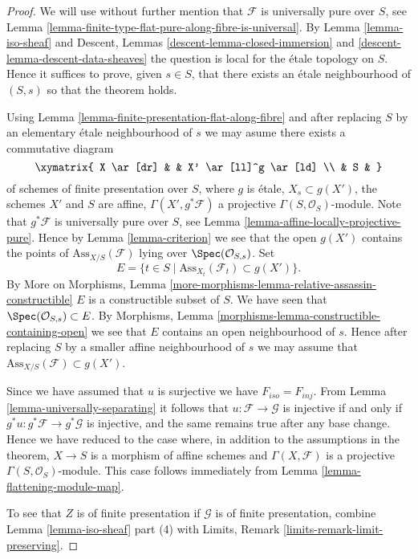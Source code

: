 \begin{proof}
We will use without further mention that $\mathcal{F}$ is universally pure
over $S$, see
Lemma \ref{lemma-finite-type-flat-pure-along-fibre-is-universal}.
By
Lemma \ref{lemma-iso-sheaf}
and
Descent, Lemmas \ref{descent-lemma-closed-immersion} and
\ref{descent-lemma-descent-data-sheaves}
the question is local for the \'etale topology on $S$.
Hence it suffices to prove, given $s \in S$, that there exists
an \'etale neighbourhood of $(S, s)$ so that the theorem holds.

\medskip\noindent
Using
Lemma \ref{lemma-finite-presentation-flat-along-fibre}
and after replacing $S$ by an elementary \'etale neighbourhood of $s$
we may asume there exists a commutative diagram
$$
\xymatrix{
X \ar[dr] & & X' \ar[ll]^g \ar[ld] \\
& S &
}
$$
of schemes of finite presentation over $S$,
where $g$ is \'etale, $X_s \subset g(X')$, the schemes $X'$ and $S$ are affine,
$\Gamma(X', g^*\mathcal{F})$ a projective $\Gamma(S, \mathcal{O}_S)$-module.
Note that $g^*\mathcal{F}$ is universally pure over $S$, see
Lemma \ref{lemma-affine-locally-projective-pure}.
Hence by
Lemma \ref{lemma-criterion}
we see that the open $g(X')$ contains the points of
$\text{Ass}_{X/S}(\mathcal{F})$ lying over $\Spec(\mathcal{O}_{S, s})$.
Set
$$
E = \{t \in S \mid \text{Ass}_{X_t}(\mathcal{F}_t) \subset g(X') \}.
$$
By
More on Morphisms,
Lemma \ref{more-morphisms-lemma-relative-assassin-constructible}
$E$ is a constructible subset of $S$. We have seen that
$\Spec(\mathcal{O}_{S, s}) \subset E$. By
Morphisms, Lemma \ref{morphisms-lemma-constructible-containing-open}
we see that $E$ contains an open neighbourhood of $s$. Hence after
replacing $S$ by a smaller affine neighbourhood of $s$ we may assume that
$\text{Ass}_{X/S}(\mathcal{F}) \subset g(X')$.

\medskip\noindent
Since we have assumed that $u$ is surjective we have $F_{iso} = F_{inj}$. From
Lemma \ref{lemma-universally-separating}
it follows that $u : \mathcal{F} \to \mathcal{G}$ is injective if and only if
$g^*u : g^*\mathcal{F} \to g^*\mathcal{G}$ is injective, and the same remains
true after any base change. Hence we have reduced to the case where,
in addition to the assumptions in the theorem, $X \to S$ is a morphism of
affine schemes and $\Gamma(X, \mathcal{F})$ is a projective
$\Gamma(S, \mathcal{O}_S)$-module. This case follows immediately from
Lemma \ref{lemma-flattening-module-map}.

\medskip\noindent
To see that $Z$ is of finite presentation if $\mathcal{G}$ is of finite
presentation, combine
Lemma \ref{lemma-iso-sheaf} part (4)
with
Limits, Remark \ref{limits-remark-limit-preserving}.
\end{proof}

